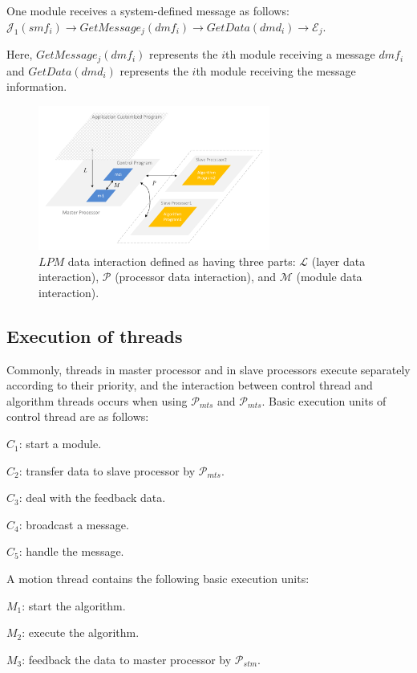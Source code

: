 \documentclass[journal,UTF8]{IEEEtran}
\begin{document}
	One module receives a system-defined message as follows:
	$\mathcal{J}_1(smf_i)\to GetMessage_{j}(dmf_i)\to GetData(dmd_i)\to\mathcal{E}_j$.
	
	Here, $GetMessage_{j}(dmf_i)$ represents the $i$th module receiving a message $dmf_i$ and $GetData(dmd_i)$ represents the $i$th module receiving the message information.
	
	\begin{figure}
		\centering
		\includegraphics[width=3in]{fig/Interaction.pdf}
		\caption{ $LPM$ data interaction defined as having three parts: $\mathcal{L}$ (layer data interaction), $\mathcal{P}$ (processor data interaction), and $\mathcal{M}$ (module data interaction).}
		\label{fig:Interaction}
	\end{figure}
	
	\subsection{Execution of threads}
	Commonly, threads in master processor and in slave processors execute separately according to their priority, and the interaction between control thread and algorithm threads occurs when using $\mathcal{P}_{mts}$ and $\mathcal{P}_{mts}$. Basic execution units of control thread are as follows:
	
	\textbf{$C_{1}$}: start a module.
	
	\textbf{$C_{2}$}: transfer data to slave processor by $\mathcal{P}_{mts}$.
	
	\textbf{$C_{3}$}: deal with the feedback data.
	
	\textbf{$C_{4}$}: broadcast a message.
	
	\textbf{$C_{5}$}: handle the message.
	
	A motion thread contains the following basic execution units:
	
	\textbf{$M_{1}$}: start the algorithm.
	
	\textbf{$M_{2}$}: execute the algorithm.
	
	\textbf{$M_{3}$}: feedback the data to master processor by $\mathcal{P}_{stm}$.
	
\end{document}
